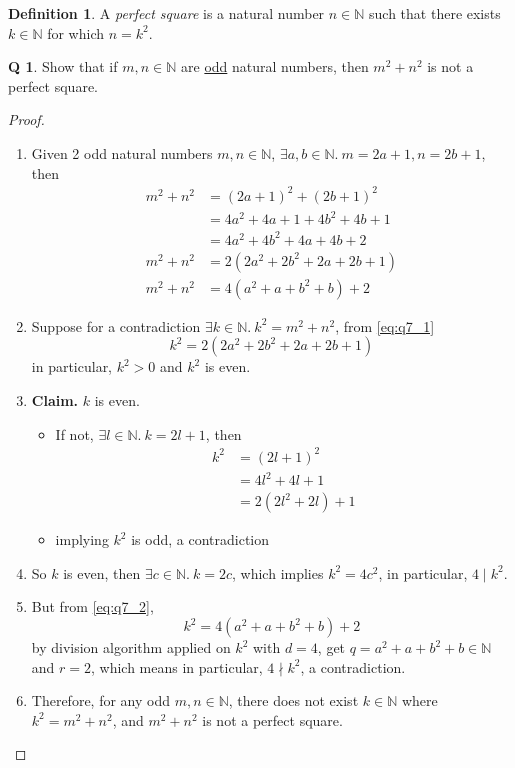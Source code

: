 \documentclass[12pt]{article}
\theoremstyle{definition}
\newtheorem{qn}{Q}
\newtheorem*{defn}{Definition}
\numberwithin{equation}{qn}
\newcommand{\nat}{\mathbb{N}}
\newenvironment{prf}
{
    \begin{proof}
        \hfill
        \begin{enumerate}[label*=\arabic*.]
                }
                {
                \hfill\qedsymbol
        \end{enumerate}
    \renewcommand{\qedsymbol}{}
    \end{proof}
}
\begin{document}
\newpage
\begin{defn}
    A \emph{perfect square} is a natural number $n\in\nat$ such that there exists $k\in\nat$ for which $n = k^2$.
\end{defn}
\begin{qn}
    Show that if $m,n\in\nat$ are \underline{odd} natural numbers, then  $m^2 + n^2$ is not a perfect square.
\end{qn}
\begin{prf}
\item Given 2 odd natural numbers $m,n\in\nat$, $\exists a,b\in\nat.~ m=2a+1, n=2b+1$, then
    \begin{align}
        m^2 + n^2 &= (2a+1)^2 + (2b + 1)^2  \\
        &= 4a^2 + 4a + 1 + 4b^2 + 4b + 1    \\
        &= 4a^2 + 4b^2 + 4a + 4b + 2 \\
        m^2 + n^2 &= 2(2a^2 + 2b^2 + 2a + 2b + 1) \label{eq:q7_1}\\
        m^2 + n^2 &= 4(a^2 + a + b^2 + b) + 2 \label{eq:q7_2}
    \end{align}
\item Suppose for a contradiction $\exists k\in\nat.~ k^2 = m^2 + n^2$, from \eqref{eq:q7_1}
    $$k^2 = 2(2a^2 + 2b^2 + 2a + 2b + 1)$$
    in particular, $k^2 > 0$ and $k^2$ is even.
\item[] \textbf{Claim.} $k$ is even.
    \begin{itemize}
        \item If not, $\exists l\in\nat.~ k = 2l + 1$, then
            \begin{align*}
                k^2 &= (2l+1)^2  \\
                    &= 4l^2 + 4l + 1\\
                    &= 2(2l^2 + 2l) + 1
            \end{align*}
        \item implying $k^2$ is odd, a contradiction
    \end{itemize}
\item So $k$ is even, then $\exists c\in\nat.~ k = 2c$, which implies $k^2 = 4c^2$, in particular, $4\mid k^2$.
\item But from \eqref{eq:q7_2},
    $$k^2 = 4(a^2 + a + b^2 + b) + 2$$
    by division algorithm applied on $k^2$ with $d=4$, get $q = a^2 + a + b^2 + b\in\nat$ and $r=2$, which means in particular, $4\nmid k^2$, a contradiction.
\item Therefore, for any odd $m,n\in\nat$, there does not exist $k\in\nat$ where $k^2 = m^2 + n^2$, and $m^2 + n^2$ is not a perfect square.
\end{prf}
\end{document}
